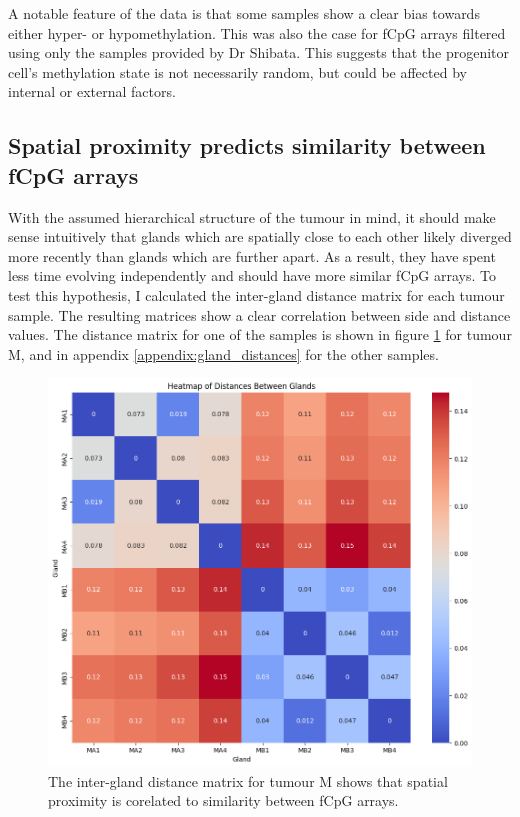 A notable feature of the data is that some samples show a clear bias towards
either hyper- or hypomethylation. This was also the case for fCpG arrays
filtered using only the samples provided by Dr Shibata. This suggests that the
progenitor cell's methylation state is not necessarily random, but could be
affected by internal or external factors.

\subsection{Spatial proximity predicts similarity between fCpG arrays}
With the assumed hierarchical structure of the tumour in mind, it should make
sense intuitively that glands which are spatially close to each other likely
diverged more recently than glands which are further apart. As a result, they
have spent less time evolving independently and should have more similar fCpG
arrays. To test this hypothesis, I calculated the inter-gland distance matrix
for each tumour sample. The resulting matrices show a clear correlation between
side and distance values. The distance matrix for one of the samples is shown
in figure \ref{fig:gland_dist_M} for tumour M, and in appendix
\ref{appendix:gland_distances} for the other samples.

\begin{figure}[h]
    \centering
    \includegraphics[width=\textwidth]{Chapter_5/figures/gland_dist_M.png}
    \caption{The inter-gland distance matrix for tumour M shows that spatial
    proximity is corelated to similarity between fCpG arrays.}
    \label{fig:gland_dist_M}
\end{figure}

